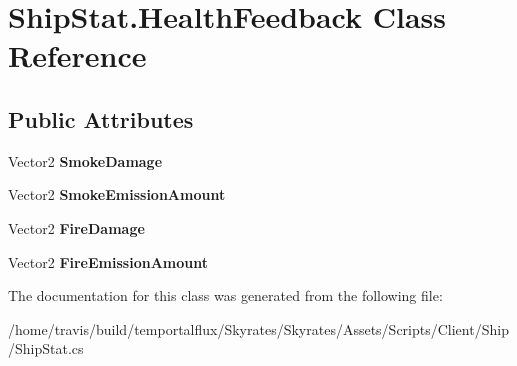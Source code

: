 \hypertarget{class_ship_stat_1_1_health_feedback}{\section{Ship\-Stat.\-Health\-Feedback Class Reference}
\label{class_ship_stat_1_1_health_feedback}
}
\subsection*{Public Attributes}
\begin{DoxyCompactItemize}
\item 
\hypertarget{class_ship_stat_1_1_health_feedback_a724d59527ca49dc73e08fc885da983b4}{Vector2 {\bfseries Smoke\-Damage}}\label{class_ship_stat_1_1_health_feedback_a724d59527ca49dc73e08fc885da983b4}

\item 
\hypertarget{class_ship_stat_1_1_health_feedback_a5cb29240ab1f6dfee7c5fd4fd2512cde}{Vector2 {\bfseries Smoke\-Emission\-Amount}}\label{class_ship_stat_1_1_health_feedback_a5cb29240ab1f6dfee7c5fd4fd2512cde}

\item 
\hypertarget{class_ship_stat_1_1_health_feedback_a4a8b3d9fe87bc4b90a128d867a6b6cfe}{Vector2 {\bfseries Fire\-Damage}}\label{class_ship_stat_1_1_health_feedback_a4a8b3d9fe87bc4b90a128d867a6b6cfe}

\item 
\hypertarget{class_ship_stat_1_1_health_feedback_a8fd882d47a81b8d07595d4f3d630df8c}{Vector2 {\bfseries Fire\-Emission\-Amount}}\label{class_ship_stat_1_1_health_feedback_a8fd882d47a81b8d07595d4f3d630df8c}

\end{DoxyCompactItemize}


The documentation for this class was generated from the following file\-:\begin{DoxyCompactItemize}
\item 
/home/travis/build/temportalflux/\-Skyrates/\-Skyrates/\-Assets/\-Scripts/\-Client/\-Ship/Ship\-Stat.\-cs\end{DoxyCompactItemize}
